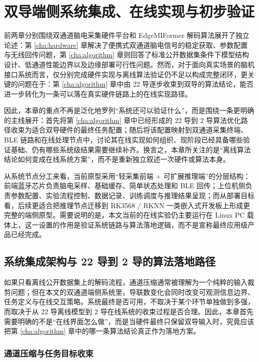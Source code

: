\chapter{双导端侧系统集成、在线实现与初步验证}
\label{cha:verification}

前两章分别围绕双通道脑电采集硬件平台和 EdgeMIFormer 解码算法展开了独立论述：第 \ref{cha:hardware} 章解决了便携式双通道脑电信号的稳定获取、参数配置与无线回传问题，第 \ref{cha:algorithm} 章则回答了标准公开数据集条件下模型结构设计、低通道性能边界以及边缘部署可行性问题。然而，对于面向真实场景的脑机接口系统而言，仅分别完成硬件实现与离线算法验证仍不足以构成完整闭环，更关键的问题在于：第 \ref{cha:algorithm} 章中由 22 导逐步收束到双导的算法结论，能否进一步转化为一条可以落在真实硬件链路上的在线实现路径。

因此，本章的重点不再是泛化地罗列“系统还可以验证什么”，而是围绕一条更明确的主线展开：首先将第 \ref{cha:algorithm} 章中已经形成的 22 导到 2 导算法优化路径收束为适合双导硬件的最终任务配置；随后将该配置映射到双通道采集终端、BLE 链路和在线处理节点中，讨论其在线实现如何组织、现阶段已经具备哪些验证基础、仍有哪些系统级结果需要继续补齐。换言之，本章所关注的是“离线算法结论如何变成在线系统方案”，而不是重新独立叙述一次硬件或算法本身。

从系统节点分工来看，当前原型采用“轻采集前端 + 可扩展推理端”的分层结构：前端蓝牙芯片负责脑电采样、基础缓存、简单状态处理和 BLE 回传；上位机侧负责参数配置、实验流程控制、数据记录、训练调度与推理结果呈现；而从部署目标看，后续更适合把推理节点迁移到 RK3568 / RKNN 一类嵌入式开发板上形成更完整的端侧原型。需要说明的是，本文当前的在线实验仍主要运行在 Linux PC 载体上，这一设置的作用是验证系统链路与算法落地逻辑，而不是宣称最终应用级产品已经完成。

\section{系统集成架构与 22 导到 2 导的算法落地路径}

如果只看离线公开数据集上的解码流程，通道压缩通常被理解为一个纯粹的输入裁剪问题；但在本文的双通道端侧系统里，导联数变化会同时改变可观测信息边界、任务定义与在线交互策略。系统最终是否可用，不取决于某个环节单独做到多强，而取决于从 22 导离线模型到 2 导在线系统的收束过程是否合理。因此，本章首先需要明确的不是“在线界面怎么做”，而是当硬件最终只保留双导输入时，究竟应该把第 \ref{cha:algorithm} 章中的哪一条算法结论真正作为落地方案。

\subsection{通道压缩与任务目标收束}

